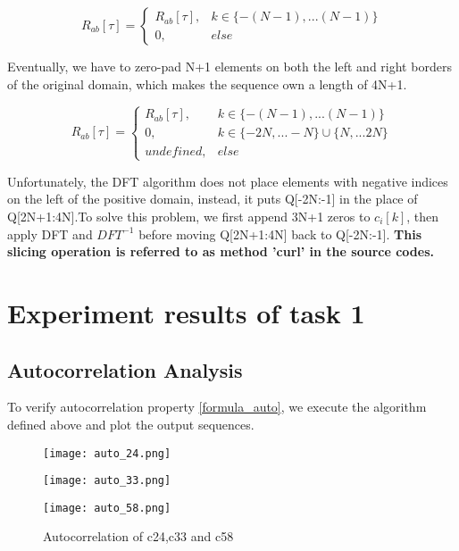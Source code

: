 \documentclass{article}
\begin{document}
\begin{equation}
    R_{ab}[\tau]=
    \begin{cases}
        R_{ab}[\tau],& k\in \{-(N-1),...(N-1)\} \\
        0,&else
    \end{cases}
\end{equation}

\indent Eventually, we have to zero-pad N+1 elements on both the left and right borders of the original domain, which makes the sequence own a length of 4N+1.

\begin{equation}
    R_{ab}[\tau]=
    \begin{cases}
        R_{ab}[\tau],& k\in \{-(N-1),...(N-1)\} \\
        0,& k \in \{-2N,...-N\} \cup \{N,...2N\}\\
        undefined,& else
    \end{cases}
\end{equation}

Unfortunately, the DFT algorithm does not place elements with negative indices on the left of the positive
domain, instead, it puts Q[-2N:-1] in the place of Q[2N+1:4N].To solve this problem, we first append 3N+1 zeros to 
$c_i[k]$, then apply DFT and $DFT^{-1}$ before moving Q[2N+1:4N] back to Q[-2N:-1]. \textbf{This slicing operation
is referred to as method 'curl' in the source codes.}

\section{Experiment results of task 1}
\subsection{Autocorrelation Analysis}

\par To verify autocorrelation property \ref{formula_auto}, we execute the algorithm defined above and plot the output sequences.
\begin{figure}[H]
\texttt{[image: auto\_24.png]}
\end{figure}
\begin{figure}[H]
\texttt{[image: auto\_33.png]}
\end{figure}
\begin{figure}[H]
\texttt{[image: auto\_58.png]}
\caption{Autocorrelation of c24,c33 and c58}
\end{figure}
\end{document}
